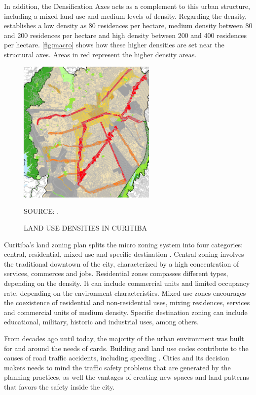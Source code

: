 In addition, the Densification Axes acts as a complement to this urban structure, including a mixed land use and medium levels of density. Regarding the density, \textcite{Curitiba2015} establishes a low density as 80 residences per hectare, medium density between 80 and 200 residences per hectare and high density between 200 and 400 residences per hectare. \autoref{fig:macro} shows how these higher densities are set near the structural axes. Areas in red represent the higher density areas. 

\begin{figure}[!htbp]
    \centering\footnotesize
    \captionsetup{font=footnotesize}
    \caption{LAND USE DENSITIES IN CURITIBA}
    \includegraphics[width=0.6\textwidth]{fig/macro2.png}
    \label{fig:macro}
    \par SOURCE: \textcite{Curitiba2015}.
\end{figure}

Curitiba's land zoning plan splits the micro zoning system into four categories: central, residential, mixed use and specific destination \cite{Curitiba2019a}. Central zoning involves the traditional downtown of the city, characterized by a high concentration of services, commerces and jobs. Residential zones compasses different types, depending on the density. It can include commercial units and limited occupancy rate, depending on the environment characteristics. Mixed use zones encourages the coexistence of residential and non-residential uses, mixing residences, services and commercial units of medium density. Specific destination zoning can include educational, military, historic and industrial uses, among others. 

From decades ago until today, the majority of the urban environment was built for and around the needs of cards. Building and land use codes contribute to the causes of road traffic accidents, including speeding \cite{Knoflacher2016}. Cities and its decision makers needs to mind the traffic safety problems that are generated by the planning practices, as well the vantages of creating new spaces and land patterns that favors the safety inside the city. 

